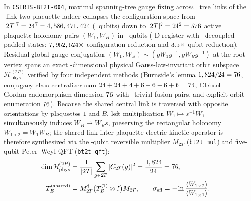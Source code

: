 \documentclass[aps,prx,twocolumn,superscriptaddress,nofootinbib]{revtex4-2}
\begin{document}
In \texttt{OSIRIS-BT2T-004}, maximal spanning-tree gauge fixing across \rfsBtTreeFixedLinks\ tree links of the \rfsBtUnfixedLinks-link two-plaquette ladder collapses the configuration space from $|2T|^7 = 24^7 = 4,586,471,424$ (\rfsBtUnfixedQubits\ qubits) down to $|2T|^2 = 24^2 = 576$ active plaquette holonomy pairs $(W_1, W_B)$ in \rfsBtGaugeFixedQubits\ qubits (\rfsBtHilbertDim-D register with \rfsBtPaddedStates\ decoupled padded states: $7,962,624\times$ configuration reduction and $3.5\times$ qubit reduction). Residual global gauge conjugation $(W_1, W_B) \sim (g W_1 g^{-1}, g W_B g^{-1})$ at the root vertex spans an exact \rfsBtPhysSubspaceDim-dimensional physical Gauss-law-invariant orbit subspace $\mathcal{H}_{\mathrm{phys}}^{(2P)}$ verified by four independent methods (Burnside's lemma $1,824 / 24 = 76$, conjugacy-class centralizer sum $24+24+4+6+6+6+6 = 76$, Clebsch--Gordan endomorphism dimension $76$ with \rfsBtTrivialFusionPairs\ trivial fusion pairs, and explicit orbit enumeration $76$). Because the shared central link is traversed with opposite orientations by plaquettes $1$ and $B$, left multiplication $W_1 \mapsto s^{-1} W_1$ simultaneously induces $W_B \mapsto W_B s$, preserving the rectangular holonomy $W_{1\times 2} = W_1 W_B$; the shared-link inter-plaquette electric kinetic operator is therefore synthesized via the \rfsBtGaugeFixedQubits-qubit reversible multiplier $M_{2T}$ (\texttt{bt2t\_mul}) and five-qubit Peter--Weyl QFT (\texttt{bt2t\_qft}):
\begin{align}
  \dim \mathcal{H}_{\mathrm{phys}}^{(2P)} &= \frac{1}{|2T|} \sum_{g \in 2T} |C_{2T}(g)|^2 = \frac{1,824}{24} = 76, \nonumber\\
  T_E^{(\mathrm{shared})} &= M_{2T}^\dagger \bigl(T_E^{(1)} \otimes I\bigr) M_{2T}, \qquad
  \sigma_{\mathrm{eff}} = -\ln\frac{\langle W_{1\times 2}\rangle}{\langle W_{1\times 1}\rangle}.
  \label{eq:bt2t004_gauss_hamiltonian}
\end{align}
\end{document}

